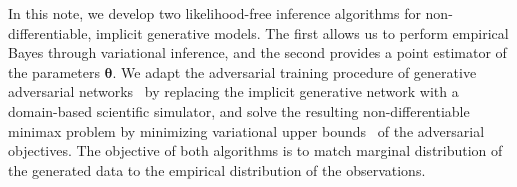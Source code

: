\documentclass[twocolumn,superscriptaddress,aps]{revtex4-1}
\newcommand{\bftheta}{{\bm \theta}}
\theoremstyle{plain}
\begin{document}
In this note, we develop two likelihood-free inference algorithms
for non-differentiable, implicit generative models. The first allows us
to perform empirical Bayes through variational inference, and the
second provides a point estimator of the parameters $\bftheta$.
We adapt the adversarial
training procedure of generative adversarial
networks~\cite{goodfellow2014generative} by replacing the implicit generative
network with a domain-based scientific simulator, and solve the resulting
non-differentiable minimax problem by minimizing variational upper
bounds~\citep{2011arXiv1106.4487W,2012arXiv1212.4507S} of the adversarial
objectives.
The objective of both algorithms is to match marginal distribution of
the generated data to the empirical distribution of the observations.





\end{document}
